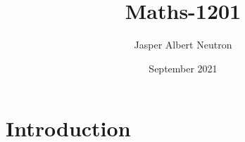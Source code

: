 \documentclass{article}
\title{Maths-1201}
\author{Jasper Albert Neutron}
\date{September 2021}
\begin{document}
\maketitle

\section{Introduction}
\end{document}
